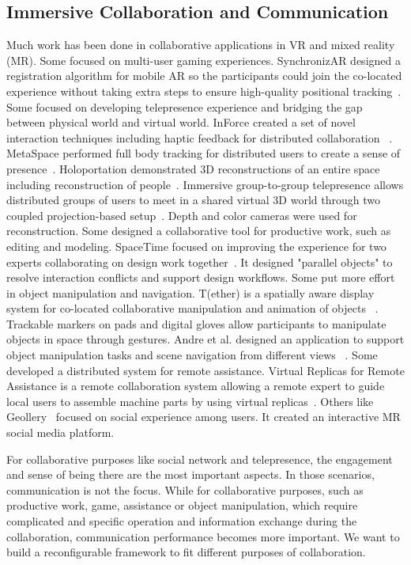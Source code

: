 \documentclass{sigchi}
\begin{document}
\subsection{Immersive Collaboration and Communication}
Much work has been done in collaborative applications in VR and mixed reality (MR). Some focused on multi-user gaming experiences. SynchronizAR designed a registration algorithm for mobile AR so the participants could join the co-located experience without taking extra steps to ensure high-quality positional tracking~\cite{huo2018synchronizar}.
Some focused on developing telepresence experience and bridging the gap between physical world and virtual world. InForce created a set of novel interaction techniques including haptic feedback for distributed collaboration ~\cite{nakagaki2019inforce}.
MetaSpace performed full body tracking for distributed users to create a sense of presence~\cite{sra2015metaspace}.
Holoportation demonstrated 3D reconstructions of an entire space including reconstruction of people~\cite{orts2016holoportation}.
Immersive group-to-group telepresence allows distributed groups of users to meet in a shared virtual 3D world through two coupled projection-based setup~\cite{beck2013immersive}. Depth and color cameras were used for reconstruction. Some designed a collaborative tool for productive work, such as editing and modeling. SpaceTime focused on improving the experience for two experts collaborating on design work together~\cite{xia2018spacetime}. It designed "parallel objects" to resolve interaction conflicts and support design workflows. Some put more effort in object manipulation and navigation. T(ether) is a spatially aware display system for co-located collaborative manipulation and animation of objects ~\cite{lakatos2014t}. Trackable markers on pads and digital gloves allow participants to manipulate objects in space through gestures. Andre et al. designed an application to support object manipulation tasks and scene navigation from different views ~\cite{kunert2019multi}. Some developed a distributed system for remote assistance. Virtual Replicas for Remote Assistance is a remote collaboration system allowing a remote expert to guide local users to assemble machine parts by using virtual replicas~\cite{oda2015virtual}. Others like Geollery~\cite{du2019geollery, du2016social} focused on social experience among users. It created an interactive MR social media platform.

For collaborative purposes like social network and telepresence, the engagement and sense of being there are the most important aspects. In those scenarios, communication is not the focus. While for collaborative purposes, such as productive work, game, assistance or object manipulation, which require complicated and specific operation and information exchange during the collaboration, communication performance becomes more important. We want to build a reconfigurable framework to fit different purposes of collaboration.
\end{document}
